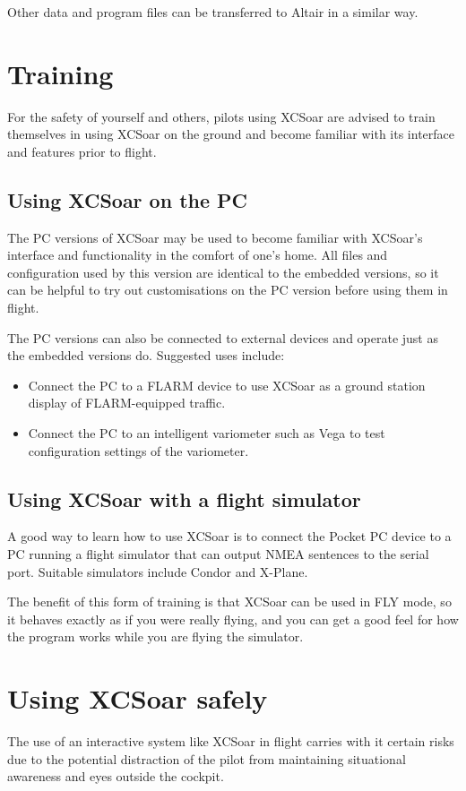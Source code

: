 \documentclass[a4paper,12pt]{refrep}
\begin{document}
Other data and program files can be transferred to Altair in a similar
way.

\section{Training}
For the safety of yourself and others, pilots using XCSoar are advised to
train themselves in using XCSoar on the ground and become familiar with its
interface and features prior to flight.

\subsection*{Using XCSoar on the PC}
The PC versions of XCSoar may be used to become familiar with XCSoar's
interface and functionality in the comfort of one's home.  All files
and configuration used by this version are identical to the embedded versions,
so it can be helpful to try out customisations on the PC version before using
them in flight.

The PC versions can also be connected to external devices and operate just as
the embedded versions do. Suggested uses include:
\begin{itemize}
\item Connect the PC to a FLARM device to use XCSoar as a ground
station display of FLARM-equipped traffic.
\item Connect the PC to an intelligent variometer such as Vega to
test configuration settings of the variometer.
\end{itemize}

\subsection*{Using XCSoar with a flight simulator}
A good way to learn how to use XCSoar is to connect the Pocket PC
device to a PC running a flight simulator that can output NMEA
sentences to the serial port. Suitable simulators include Condor and
X-Plane.  

The benefit of this form of training is that XCSoar can be used in FLY
mode, so it behaves exactly as if you were really flying, and you can
get a good feel for how the program works while you are flying the
simulator.

\section{Using XCSoar safely}
The use of an interactive system like XCSoar in flight carries with it
certain risks due to the potential distraction of the pilot from
maintaining situational awareness and eyes outside the cockpit.
\end{document}
